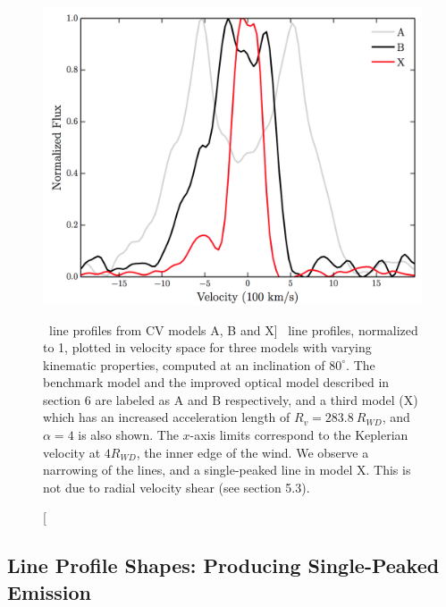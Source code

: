 \begin{figure}
\centering
\includegraphics[width=1.0\textwidth]{figures/05-cvpaper/mc.png}
\caption
[\ha\ line profiles from CV models A, B and X]
{
\ha\ line profiles, normalized to 1, plotted in velocity space 
for three models with varying kinematic 
properties, computed at an inclination of $80^\circ$.
The benchmark model and the improved optical
model described in section 6 are labeled as A and B respectively,
and a third model (X) which has an increased acceleration length of 
$R_v = 283.8~R_{WD}$, and $\alpha=4$ is also shown. 
The $x$-axis limits correspond to the Keplerian velocity at 
$4R_{WD}$, the inner edge of the wind.
We observe a narrowing of the lines, and a single-peaked line in model X.
This is not due to radial velocity shear (see section 5.3).
}
\label{halpha}
\end{figure} %






\subsection{Line Profile Shapes: Producing Single-Peaked Emission}


